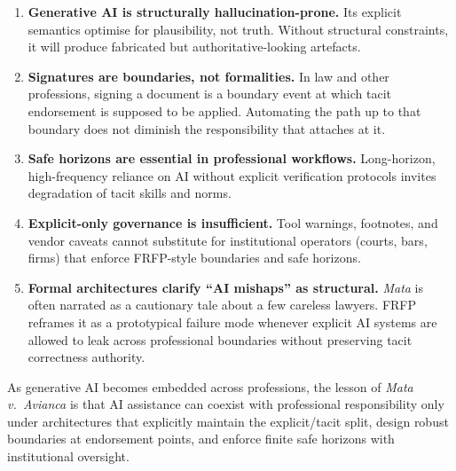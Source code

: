 \begin{enumerate}
  \item \textbf{Generative AI is structurally hallucination-prone.}
        Its explicit semantics optimise for plausibility, not truth.
        Without structural constraints, it will produce fabricated but
        authoritative-looking artefacts.

  \item \textbf{Signatures are boundaries, not formalities.}
        In law and other professions, signing a document is a boundary event
        at which tacit endorsement is supposed to be applied.
        Automating the path up to that boundary does not diminish the
        responsibility that attaches at it.

  \item \textbf{Safe horizons are essential in professional workflows.}
        Long-horizon, high-frequency reliance on AI without explicit
        verification protocols invites degradation of tacit skills and norms.

  \item \textbf{Explicit-only governance is insufficient.}
        Tool warnings, footnotes, and vendor caveats cannot substitute for
        institutional operators (courts, bars, firms) that enforce FRFP-style
        boundaries and safe horizons.

  \item \textbf{Formal architectures clarify ``AI mishaps'' as structural.}
        \emph{Mata} is often narrated as a cautionary tale about a few careless
        lawyers.
        FRFP reframes it as a prototypical failure mode whenever explicit
        AI systems are allowed to leak across professional boundaries without
        preserving tacit correctness authority.
\end{enumerate}

As generative AI becomes embedded across professions, the lesson of
\emph{Mata v.\ Avianca} is that AI assistance can coexist with professional
responsibility only under architectures that explicitly maintain the
explicit/tacit split, design robust boundaries at endorsement points, and
enforce finite safe horizons with institutional oversight.
